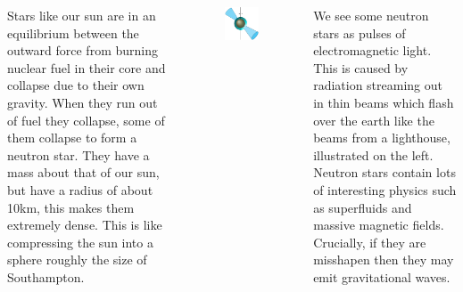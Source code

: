 \documentclass[20pt, a1paper, portrait, margin=0mm, innermargin=10mm,
               blockverticalspace=10mm,colspace=5mm, subcolspace=0mm]
               {tikzposter}
\begin{document}
\begin{columns}
{Stars like our sun are in an equilibrium between the outward force from burning
nuclear fuel in their core and collapse due to their own gravity.  When they
run out of fuel they collapse, some of them collapse to form a neutron star.
They have a mass about that of our sun, but have a radius of about 10km, this
makes them extremely dense. This is like compressing the sun into a sphere
roughly the size of Southampton.
\vspace{4mm}
\begin{figure}
    \vspace{-15mm}
\begin{tikzfigure}
\centering
\includegraphics[width=\linewidth]{img/star-crop}
\end{tikzfigure}
\end{figure}

We see some neutron stars as pulses of electromagnetic light. This is caused by
radiation streaming out in thin beams which flash over the earth like the beams
from a lighthouse, illustrated on the left.  Neutron stars contain lots of
interesting physics such as superfluids and massive magnetic fields. Crucially,
if they are misshapen then they may emit gravitational waves. 
\vspace{2.3mm}
}

\end{columns}
\end{document}
